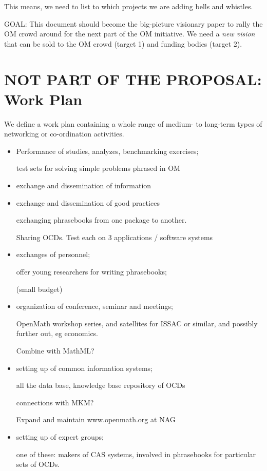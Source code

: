\documentclass{euproposal}
\begin{document}
This means, we need to list to which projects we are adding bells and
whistles.

GOAL: This document should become the big-picture visionary paper to
rally the OM crowd around for the next part of the OM initiative.  We
need a \emph{new vision} that can be sold to the OM crowd (target 1)
and funding bodies (target 2).


\section{NOT PART OF THE PROPOSAL: Work Plan}
We define a work plan containing a whole range of medium- to long-term
types of networking or co-ordination activities.
\begin{itemize}
\item Performance of studies, analyzes, benchmarking exercises;

test sets for  solving simple problems phrased in OM


\item exchange and dissemination of information

\item exchange and dissemination of good practices

exchanging phrasebooks from one package to another.

Sharing OCDs.
Test each on 3 applications / software systems

\item exchanges of personnel;

offer young researchers for writing phrasebooks;

(small  budget)


\item organization of conference, seminar and meetings;

OpenMath workshop series, and satellites for ISSAC or similar, and
possibly further out, eg economics.

Combine with MathML?

\item setting up of common information systems;

all the data base, knowledge base repository of OCDs

connections with MKM?

Expand and maintain www.openmath.org at NAG


\item setting up of expert groups;

one of these: makers of CAS systems, involved in phrasebooks for
particular sets of OCDs.


\end{itemize}
\end{document}
